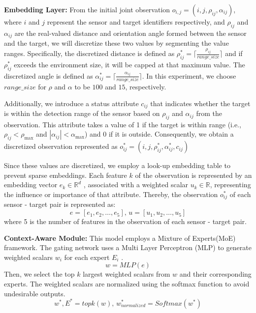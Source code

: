 \documentclass[preprint,12pt]{elsarticle}
\begin{document}
\noindent\textbf{Embedding Layer:} From the initial joint observation $o_{i,j} = (i,j,\rho_{ij},\alpha_{ij})$, where $i$ and $j$ represent the sensor and target identifiers respectively, and $\rho_{ij}$ and $\alpha_{ij}$ are the real-valued distance and orientation angle formed between the sensor and the target, we will discretize these two values by segmenting the value ranges. Specifically, the discretized distance is defined as $\rho^*_{ij} =\lceil\frac{\rho_{ij}}{range\_size}\rceil $  and if $\rho^*_{ij}$ exceeds the environment size, it will be capped at that maximum value. The discretized angle is defined as $\alpha^*_{ij} =\lceil\frac{\alpha_{ij}}{range\_size}\rceil$. In this experiment, we choose $range\_size$ for $\rho$ and $\alpha$ to be $100$ and $15$, respectively.

Additionally, we introduce a status attribute $c_{ij}$ that indicates whether the target is within the detection range of the sensor based on $\rho_{ij}$ and $\alpha_{ij}$ from the observation. This attribute takes a value of 1 if the target is within range (i.e., \( \rho_{ij} < \rho_{\text{max}} \) and \( |\alpha_{ij}| < \alpha_{\text{max}} \)) and 0 if it is outside. Consequently, we obtain a discretized observation represented as $o^*_{ij} = (i,j,\rho^*_{ij},\alpha^*_{ij},c_{ij})$

Since these values are discretized, we employ a look-up embedding table to prevent sparse embeddings. Each feature $k$ of the observation is represented by an embedding vector $e_k\in \mathbb{R}^d$ , associated with a weighted scalar $u_k\in\mathbb{R}$, representing the influence or importance of that attribute. Thereby, the observation $o^*_{ij}$ of each sensor - target pair is represented as:  
\begin{equation*}
e = [e_1, e_2, \dots, e_5], \, u = [u_1, u_2, \dots, u_5]
\end{equation*}
where 5 is the number of features in the observation of each sensor - target pair.


\noindent\textbf{Context-Aware Module:} This model employs a Mixture of Experts(MoE) framework. 
The gating network uses a Multi Layer Perceptron (MLP) to generate weighted scalars $w_i$ for each expert $E_{i}$ . 
\begin{equation}
w = MLP(e)
\end{equation}
Then, we select the top $k$ largest weighted scalars from $w$ and their corresponding experts. The weighted scalars are normalized using the softmax function to avoid undesirable outputs.
\begin{equation}
w^*, E^* = topk (w), \,
w^*_{normalized} = Softmax(w^*)
\end{equation}
\end{document}

